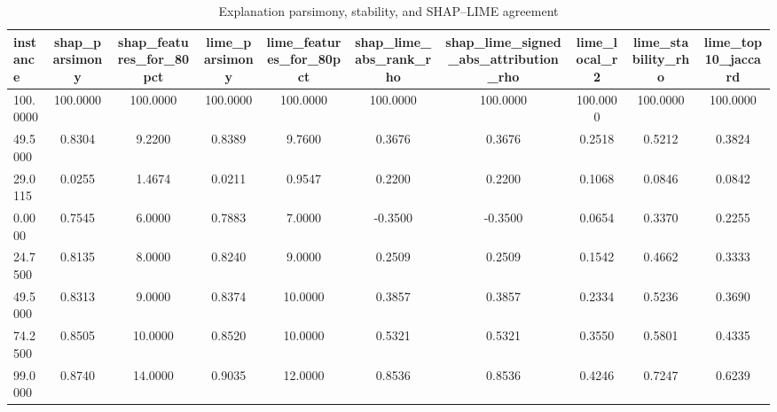 \begin{table}
\centering
\caption{Explanation parsimony, stability, and SHAP--LIME agreement}
\label{tab:explanation_quality}
\begin{tabular}{lccccccccc}
\toprule
instance & shap_parsimony & shap_features_for_80pct & lime_parsimony & lime_features_for_80pct & shap_lime_abs_rank_rho & shap_lime_signed_abs_attribution_rho & lime_local_r2 & lime_stability_rho & lime_top10_jaccard \\
\midrule
100.0000 & 100.0000 & 100.0000 & 100.0000 & 100.0000 & 100.0000 & 100.0000 & 100.0000 & 100.0000 & 100.0000 \\
49.5000 & 0.8304 & 9.2200 & 0.8389 & 9.7600 & 0.3676 & 0.3676 & 0.2518 & 0.5212 & 0.3824 \\
29.0115 & 0.0255 & 1.4674 & 0.0211 & 0.9547 & 0.2200 & 0.2200 & 0.1068 & 0.0846 & 0.0842 \\
0.0000 & 0.7545 & 6.0000 & 0.7883 & 7.0000 & -0.3500 & -0.3500 & 0.0654 & 0.3370 & 0.2255 \\
24.7500 & 0.8135 & 8.0000 & 0.8240 & 9.0000 & 0.2509 & 0.2509 & 0.1542 & 0.4662 & 0.3333 \\
49.5000 & 0.8313 & 9.0000 & 0.8374 & 10.0000 & 0.3857 & 0.3857 & 0.2334 & 0.5236 & 0.3690 \\
74.2500 & 0.8505 & 10.0000 & 0.8520 & 10.0000 & 0.5321 & 0.5321 & 0.3550 & 0.5801 & 0.4335 \\
99.0000 & 0.8740 & 14.0000 & 0.9035 & 12.0000 & 0.8536 & 0.8536 & 0.4246 & 0.7247 & 0.6239 \\
\bottomrule
\end{tabular}
\end{table}
